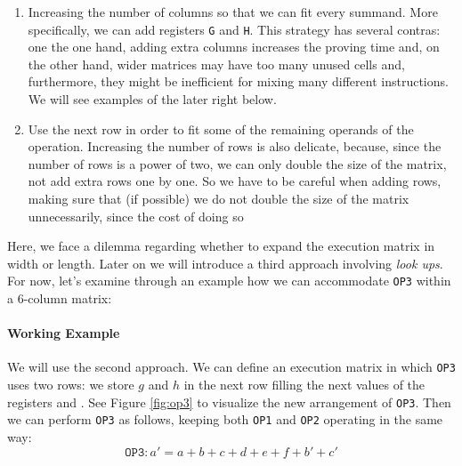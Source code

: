 \begin{enumerate}

\item Increasing the number of columns so that we can fit every summand. More specifically, we can add registers \texttt{G} and \texttt{H}. This strategy has several contras: one the one hand, adding extra columns increases the proving time and, on the other hand, wider matrices may have too many unused cells and, furthermore, they might be inefficient for mixing many different instructions. We will see examples of the later right below.

\item Use the next row in order to fit some of the remaining operands of the operation. Increasing the number of rows is also delicate, because, since the number of rows is a power of two, we can only double the size of the matrix, not add extra rows one by one. So we have to be careful when adding rows, making sure that (if possible) we do not double the size of the matrix unnecessarily, since the cost of doing so

\end{enumerate}

Here, we face a dilemma regarding whether to expand the execution matrix in width or length. Later on we will introduce a third approach involving \textit{look ups}. For now, let's examine through an example how we can accommodate \texttt{OP3} within a 6-column matrix:


\paragraph*{Working Example}
We will use the second approach. We can define an execution matrix in which \texttt{OP3} uses two rows: we store $g$ and $h$ in the next row filling the next values of the registers \B and \C. See Figure \ref{fig:op3} to visualize the new arrangement of \texttt{OP3}. Then we can perform \texttt{OP3} as follows, keeping both \texttt{OP1} and \texttt{OP2} operating in the same way:
\[
\texttt{OP3}: a'=a+b+c+d+e+f+b'+c'
\]

